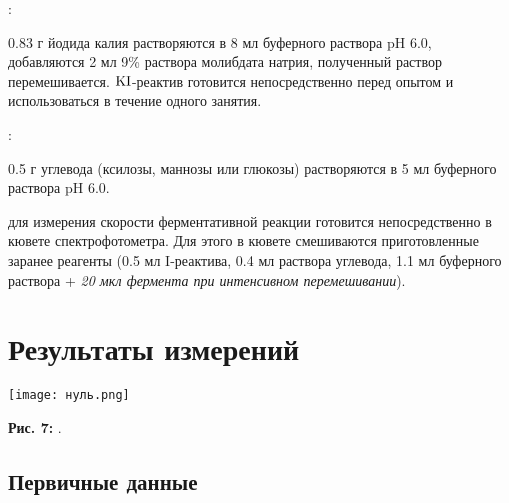 \documentclass[a4paper]{article}
\begin{document}
 \hspace{0.1 cm} \textbf{}: \normalfont \par \vspace{0.1 cm}
0.83 г йодида калия растворяются в 8 мл буферного раствора pH 6.0, добавляются 2 мл 9\% раствора молибдата натрия, полученный раствор перемешивается. $\rm KI$-реактив готовится непосредственно перед опытом и использоваться в течение одного занятия.
\par \vspace{0.5 cm}

 \hspace{0.1 cm} 
\textbf{}: \normalfont \par \vspace{0.1 cm}
0.5 г углевода (ксилозы, маннозы или глюкозы) растворяются в 5 мл буферного раствора pH 6.0. \par \vspace{0.5 cm}

 \hspace{0.1 cm}
\textbf{} \normalfont для измерения скорости ферментативной реакции готовится непосредственно в кювете спектрофотометра. Для этого в кювете смешиваются приготовленные заранее реагенты (0.5 мл I-реактива, 0.4 мл раствора углевода, 1.1 мл буферного раствора + \textit{20 мкл фермента при интенсивном перемешивании}). \par \vspace{1.5 cm}



\section{\LARGE Результаты измерений}

\graphicspath{{./images/}}
		\begin{center}
		
			\texttt{[image: нуль.png]}
    \par
\textbf{Рис. 7: }.
 \end{center}
\par \vspace{0.5 cm}

\newpage
\subsection{\Large Первичные данные}
\end{document}
